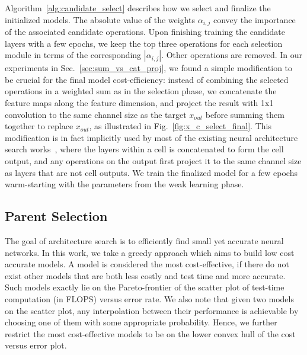 Algorithm~\ref{alg:candidate_select} describes how we select and finalize the initialized models. 
The absolute value of the weights $\alpha_{i,j}$ convey the importance of the associated candidate operations. Upon finishing training the candidate layers with a few epochs, we keep the top three operations for each selection module in terms of the corresponding $| \alpha _{i,j} |$. 
Other operations are removed. In our experiments in Sec.~\ref{sec:sum_vs_cat_proj}, we found a simple modification to be crucial for the final model cost-efficiency: instead of combining the selected operations in a weighted sum as in the selection phase, we concatenate the feature maps along the feature dimension, and project the result with 1x1 convolution to the same channel size as the target $x_{out}$ before summing them together to replace $x_{out}$, as illustrated in Fig.~\ref{fig:x_c_select_final}. This modification is in fact implicitly used by most of the existing neural architecture search works~\citep{NASCell,Pham2018EfficientNA}, where the layers within a cell is concatenated to form the cell output, and any operations on the output first project it to the same channel size as layers that are not cell outputs. We train the finalized model for a few epochs warm-starting with the parameters from the weak learning phase. 






\subsection{Parent Selection}
\label{sec:parent_choice}




The goal of architecture search is to efficiently find small yet accurate
neural networks. In this work, we take a greedy approach which aims to build low cost accurate models. A model is considered the most
cost-effective, if there do not exist other models that are both less
costly and test time and more accurate. Such models exactly lie on the
Pareto-frontier of the scatter plot of test-time computation (in
FLOPS) versus error rate. We also note that given two models on the
scatter plot, any interpolation between their performance is achievable 
by choosing one of them with some appropriate probability. 
Hence, we further restrict the most cost-effective
models to be on the lower convex hull of the cost versus error plot.

